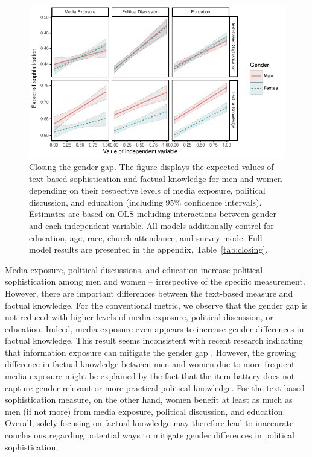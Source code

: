 \documentclass[12pt]{article}
\begin{document}
\begin{figure}[h]\centering
\includegraphics{../fig/closing.pdf}
\caption{Closing the gender gap. The figure displays the expected values of text-based sophistication and factual knowledge for men and women depending on their respective levels of media exposure, political discussion, and education (including 95\% confidence intervals). Estimates are based on OLS including interactions between gender and each independent variable. All models additionally control for education, age, race, church attendance, and survey mode. Full model results are presented in the appendix, Table~\ref{tab:closing}.}\label{fig:closing}
\end{figure}

Media exposure, political discussions, and education increase political sophistication among men and women -- irrespective of the specific measurement. However, there are important differences between the text-based measure and factual knowledge. For the conventional metric, we observe that the gender gap is not reduced with higher levels of media exposure, political discussion, or education. Indeed, media exposure even appears to increase gender differences in factual knowledge. This result seems inconsistent with recent research indicating that information exposure can mitigate the gender gap \citep[e.g.,][]{jerit2017revisiting}. However, the growing difference in factual knowledge between men and women due to more frequent media exposure might be explained by the fact that the item battery does not capture gender-relevant \citep{dolan2011women} or more practical \citep{stolle2010women} political knowledge. For the text-based sophistication measure, on the other hand, women benefit at least as much as men (if not more) from media exposure, political discussion, and education. Overall, solely focusing on factual knowledge may therefore lead to inaccurate conclusions regarding potential ways to mitigate gender differences in political sophistication.
\end{document}
